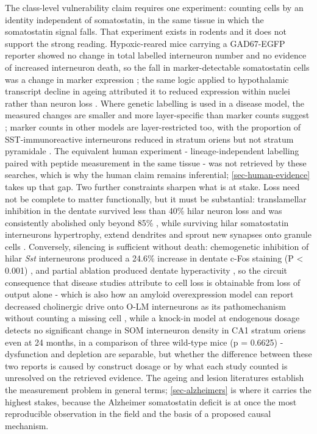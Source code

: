\documentclass[11pt]{article}
\begin{document}
The class-level vulnerability claim requires one experiment: counting cells by an identity independent of somatostatin, in the same tissue in which the somatostatin signal falls. That experiment exists in rodents and it does not support the strong reading. Hypoxic-reared mice carrying a GAD67-EGFP reporter showed no change in total labelled interneuron number and no evidence of increased interneuron death, so the fall in marker-detectable somatostatin cells was a change in marker expression \citep{Komitova2013}; the same logic applied to hypothalamic transcript decline in ageing attributed it to reduced expression within nuclei rather than neuron loss \citep{SONNTAG1990}. Where genetic labelling is used in a disease model, the measured changes are smaller and more layer-specific than marker counts suggest \citep{Drake2024}; marker counts in other models are layer-restricted too, with the proportion of SST-immunoreactive interneurons reduced in stratum oriens but not stratum pyramidale \citep{Marks2016}. The equivalent human experiment - lineage-independent labelling paired with peptide measurement in the same tissue - was not retrieved by these searches, which is why the human claim remains inferential; \ref{sec-human-evidence} takes up that gap. Two further constraints sharpen what is at stake. Loss need not be complete to matter functionally, but it must be substantial: translamellar inhibition in the dentate survived less than 40\% hilar neuron loss and was consistently abolished only beyond 85\% \citep{Zappone2004}, while surviving hilar somatostatin interneurons hypertrophy, extend dendrites and sprout new synapses onto granule cells \citep{Zhang2009}. Conversely, silencing is sufficient without death: chemogenetic inhibition of hilar \emph{Sst} interneurons produced a 24.6\% increase in dentate c-Fos staining (P < 0.001) \citep{Lyu2023}, and partial ablation produced dentate hyperactivity \citep{Nagarajan2023}, so the circuit consequence that disease studies attribute to cell loss is obtainable from loss of output alone - which is also how an amyloid overexpression model can report decreased cholinergic drive onto O-LM interneurons as its pathomechanism without counting a missing cell \citep{Schmid2016}, while a knock-in model at endogenous dosage detects no significant change in SOM interneuron density in CA1 stratum oriens even at 24 months, in a comparison of three wild-type mice (p = 0.6625) \citep{Sos2020} - dysfunction and depletion are separable, but whether the difference between these two reports is caused by construct dosage or by what each study counted is unresolved on the retrieved evidence. The ageing and lesion literatures establish the measurement problem in general terms; \ref{sec-alzheimers} is where it carries the highest stakes, because the Alzheimer somatostatin deficit is at once the most reproducible observation in the field and the basis of a proposed causal mechanism.
\end{document}
